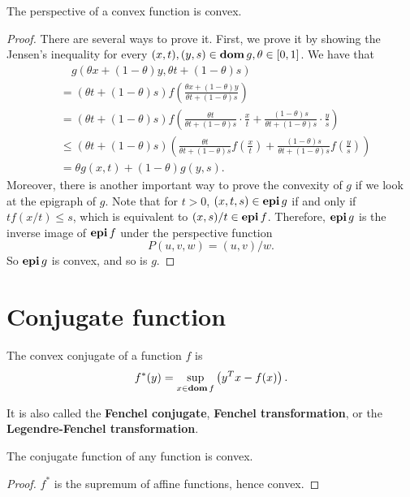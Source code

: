 \documentclass[12pt]{article}
\begin{document}
\begin{proposition}
    The perspective of a convex function is convex.
\end{proposition}
\begin{proof}
    There are several ways to prove it. First, we prove it by showing the Jensen's inequality for every \((x,t),(y,s)\in\operatorname{\mathbf{dom}} g,\theta\in[0,1]\). We have that
    \[\begin{aligned}
        &\quad g(\theta x+(1-\theta)y,\theta t+(1-\theta)s)\\
        &= \left(\theta t+(1-\theta)s\right)f\left(\frac{\theta x+(1-\theta)y}{\theta t+(1-\theta)s}\right)\\
        &= \left(\theta t+(1-\theta)s\right)f\left(\frac{\theta t}{\theta t+(1-\theta)s}\cdot\frac xt+\frac{(1-\theta)s}{\theta t+(1-\theta)s}\cdot\frac ys\right)\\
        &\leqslant \left(\theta t+(1-\theta)s\right)\left(\frac{\theta t}{\theta t+(1-\theta)s}f\left(\frac xt\right)+\frac{(1-\theta)s}{\theta t+(1-\theta)s}f\left(\frac ys\right)\right)\\
        &= \theta g(x,t)+(1-\theta)g(y,s).
    \end{aligned}\]
    Moreover, there is another important way to prove the convexity of \(g\) if we look at the epigraph of \(g\). Note that for \(t>0\), \((x,t,s)\in\operatorname{\mathbf{epi}} g\) if and only if \(tf(x/t)\leqslant s\), which is equivalent to \((x,s)/t\in\operatorname{\mathbf{epi}} f\). Therefore, \(\operatorname{\mathbf{epi}} g\) is the inverse image of \(\operatorname{\mathbf{epi}} f\) under the perspective function
    \[P(u,v,w)=(u,v)/w.\]
    So \(\operatorname{\mathbf{epi}} g\) is convex, and so is \(g\).
\end{proof}

\section{Conjugate function}

\begin{definition}
    The \textnormal{convex conjugate} of a function \(f\) is
    \[f^\ast(y)=\sup_{x\in\operatorname{\mathbf{dom}} f}\left(y^Tx-f(x)\right).\]
\end{definition}

It is also called the \textbf{Fenchel conjugate}, \textbf{Fenchel transformation}, or the \textbf{Legendre-Fenchel transformation}.

\begin{remark}
    The conjugate function of any function is convex.
\end{remark}
\begin{proof}
    \(f^\ast\) is the supremum of affine functions, hence convex.
\end{proof}
\end{document}
